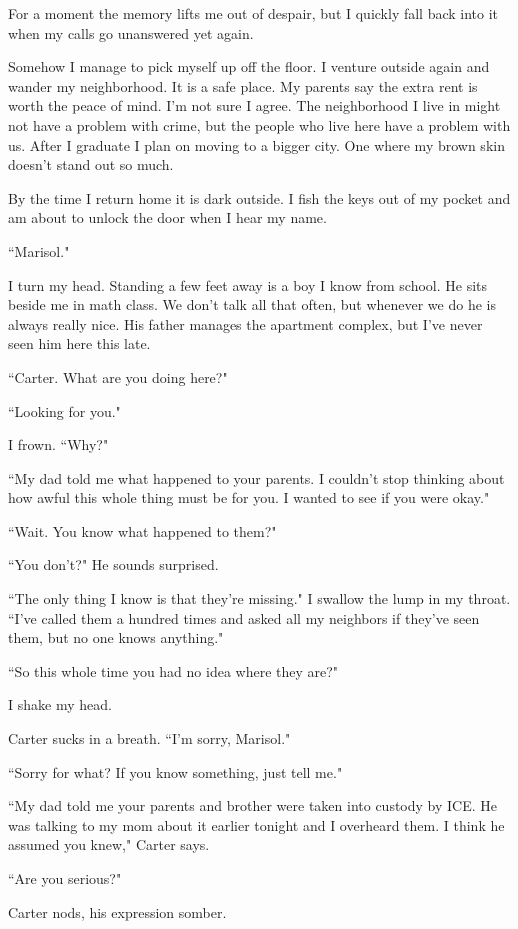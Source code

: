 \documentclass[10pt,a4paper]{article}
\newcommand{\qm}[1]{``#1"}
\begin{document}
For a moment the memory lifts me out of despair, but I quickly fall back into it when my calls go unanswered yet again.

Somehow I manage to pick myself up off the floor. I venture outside again and wander my neighborhood. It is a safe place. My parents say the extra rent is worth the peace of mind. I'm not sure I agree. The neighborhood I live in might not have a problem with crime, but the people who live here have a problem with us. After I graduate I plan on moving to a bigger city. One where my brown skin doesn't stand out so much.

By the time I return home it is dark outside. I fish the keys out of my pocket and am about to unlock the door when I hear my name.

\qm{Marisol.}

I turn my head. Standing a few feet away is a boy I know from school. He sits beside me in math class. We don't talk all that often, but whenever we do he is always really nice. His father manages the apartment complex, but I've never seen him here this late.

\qm{Carter. What are you doing here?}

\qm{Looking for you.}

I frown. \qm{Why?}

\qm{My dad told me what happened to your parents. I couldn't stop thinking about how awful this whole thing must be for you. I wanted to see if you were okay.}

\qm{Wait. You know what happened to them?}

\qm{You don't?} He sounds surprised.

\qm{The only thing I know is that they're missing.} I swallow the lump in my throat. \qm{I've called them a hundred times and asked all my neighbors if they've seen them, but no one knows anything.}

\qm{So this whole time you had no idea where they are?}

I shake my head.

Carter sucks in a breath. \qm{I'm sorry, Marisol.}

\qm{Sorry for what? If you know something, just tell me.}

\qm{My dad told me your parents and brother were taken into custody by ICE. He was talking to my mom about it earlier tonight and I overheard them. I think he assumed you knew,} Carter says.

\qm{Are you serious?}

Carter nods, his expression somber.
\end{document}
